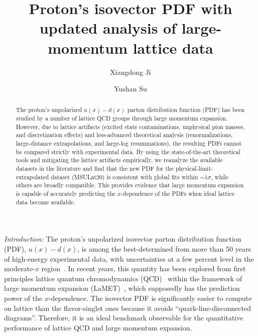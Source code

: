 \documentclass[prl,aps,twocolumn,preprintnumbers, showpacs, nofootinbib,superscriptaddress,notitlepage]{revtex4-1}
\begin{document}
\title{Proton's isovector PDF with updated analysis of large-momentum lattice data}

\author{Xiangdong Ji}

\author{Yushan Su}

\begin{abstract}
The proton's unpolarized $u(x)-d(x)$ parton distribution function (PDF) has been studied by a number of lattice QCD groups through large momentum expansion. However, due to lattice artifacts (excited state contaminations, unphysical pion masses, and discretization effects) and less-advanced theoretical analysis (renormalizations, large-distance extrapolations, and large-log resummations), the resulting PDFs cannot be compared strictly with experimental data. By using the state-of-the-art theoretical tools and mitigating the lattice artifacts empirically, we reanalyze the available datasets in the literature and find that the new PDF for the physical-limit-extrapolated dataset (MSULat20) is consistent with global fits within $\sim1\sigma$, while others are broadly compatible. This provides evidence that large momentum expansion is capable of accurately predicting the $x$-dependence of the PDFs when ideal lattice data become available. 
\end{abstract}


\maketitle


\textit{Introduction:}
\quad The proton's unpolarized isovector parton distribution function (PDF), $u(x)-d(x)$, is among the best-determined from more than 50 years of high-energy experimental data, with uncertainties at a few percent level in the moderate-$x$ region~\cite{ATLAS:2021vod,NNPDF:2021njg,Bailey:2020ooq,Hou:2019efy,Alekhin:2017kpj,H1:2015ubc,Jimenez-Delgado:2014twa}. In recent years, this quantity has been explored from first principles lattice quantum chromodynamics (QCD)~\cite{Wilson:1974sk} within the framework of large momentum expansion (LaMET)~\cite{Ji:2013dva,Ji:2014gla,Ji:2020byp,Ji:2022ezo,Ji:2024oka}, which supposedly has the prediction power of the $x$-dependence. 
The isovector PDF is significantly easier to compute on lattice than the flavor-singlet ones because it avoids ``quark-line-disconnected diagrams''. Therefore, it is an ideal  benchmark observable for the quantitative performance of lattice QCD and large momentum expansion. 
\end{document}
